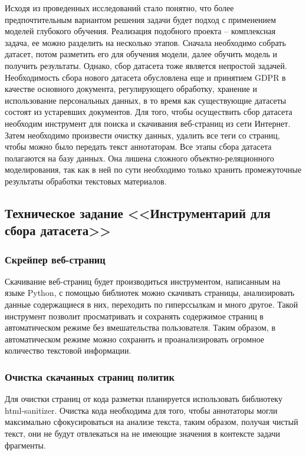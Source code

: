 \documentclass[../main]{subfiles}
\begin{document}
Исходя из проведенных исследований стало понятно, что более предпочтительным вариантом решения задачи будет подход с применением моделей глубокого обучения. Реализация подобного проекта -- комплексная задача, ее можно разделить на несколько этапов. Сначала необходимо собрать датасет, потом разметить его для обучения модели, далее обучить модель и получить результаты. Однако, сбор датасета тоже является непростой задачей. Необходимость сбора нового датасета обусловлена еще и принятием GDPR в качестве основного документа, регулирующего обработку, хранение и использование персональных данных, в то время как существующие датасеты состоят из устаревших документов. Для того, чтобы осуществить сбор датасета необходим инструмент для поиска и скачивания веб-страниц из сети Интернет. Затем необходимо произвести очистку данных, удалить все теги со страниц, чтобы можно было передать текст аннотаторам. Все этапы сбора датасета полагаются на базу данных. Она лишена сложного объектно-реляционного моделирования, так как в ней по сути необходимо только хранить промежуточные результаты обработки текстовых материалов.

\subsection{Техническое задание <<Инструментарий для сбора датасета>>}

\subsubsection{Скрейпер веб-страниц}
Скачивание веб-страниц будет производиться инструментом, написанным на языке Python, с помощью библиотек можно скачивать страницы, анализировать данные содержащиеся в них, переходить по гиперссылкам и много другое. Такой инструмент позволит просматривать и сохранять содержимое страниц в автоматическом режиме без вмешательства пользователя. Таким образом, в автоматическом режиме можно сохранить и проанализировать огромное количество текстовой информации.

\subsubsection{Очистка скачанных страниц политик}
Для очистки страниц от кода разметки планируется использовать библиотеку html-sanitizer. Очистка кода необходима для того, чтобы аннотаторы могли максимально сфокусироваться на анализе текста, таким образом, получая чистый текст, они не будут отвлекаться на не имеющие значения в контексте задачи фрагменты.
\end{document}
